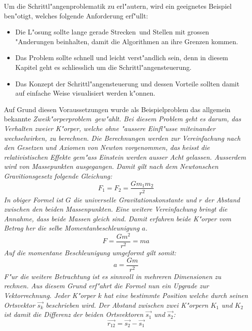 \begin{refsection}
Um die Schrittl"angenproblematik zu erl"autern, wird ein geeignetes Beispiel ben"otigt, welches folgende Anforderung erf"ullt: 
\begin{itemize}
\item Die L"osung sollte \glqq lange gerade Strecken\grqq~und Stellen mit grossen "Anderungen beinhalten, damit die Algorithmen an ihre Grenzen kommen.
\item Das Problem sollte schnell und leicht verst"andlich sein, denn in diesem Kapitel geht es schliesslich um die Schrittl"angensteuerung.
\item Das Konzept der Schrittl"angensteuerung und dessen Vorteile sollten damit auf einfache Weise visualisiert werden k"onnen.
\end{itemize}
Auf Grund diesen Voraussetzungen wurde als Beispielproblem das allgemein bekannte \em Zweik"orperproblem\em~gew"ahlt.
Bei diesem Problem geht es darum, das Verhalten zweier K"orper, welche ohne "aussere Einfl"usse miteinander wechselwirken, zu berechnen. 
Die Berechnungen werden zur Vereinfachung nach den Gesetzen und Axiomen von Newton vorgenommen, das heisst die relativistischen Effekte gem"ass Einstein werden ausser Acht gelassen.
Ausserdem wird von Massepunkten ausgegangen.
Damit gilt nach dem Newtonschen Gravitionsgesetz folgende Gleichung:
\begin{equation} \label{eq:newton}
F_1 = F_2=\frac{G m_1 m_2}{r^2}
\end{equation}
In obiger Formel ist $G$ die universelle Gravitationskonstante und $r$ der Abstand zwischen den beiden Massenpunkten.
Eine weitere Vereinfachung bringt die Annahme, dass beide Massen gleich sind. 
Damit erfahren beide K"orper vom Betrag her die selbe Momentanbeschleunigung $a$.
\begin{equation}
F=\frac{G m^2}{r^2}=m a
\end{equation}
Auf die momentane Beschleunigung umgeformt gilt somit:
\begin{equation}
a=\frac{G m}{r^2} \label{eq:beschleunigungSkalar}
\end{equation}
F"ur die weitere Betrachtung ist es sinnvoll in mehreren Dimensionen zu rechnen.
Aus diesem Grund erf"ahrt die Formel nun ein Upgrade zur Vektorrechnung.
Jeder K"orper $k$ hat eine bestimmte Position welche durch seinen Ortsvektor $\vec{s_k}$ beschrieben wird.
Der Abstand zwischen zwei K"orpern $K_1$ und $K_2$ ist damit die Differenz der beiden Ortsvektoren  $\vec{s_1}$ und $\vec{s_2}$:
\begin{equation} \label{eq:abstand}
\vec{r_{12}}= \vec{s_2}-\vec{s_1}

\end{equation}
\end{refsection}
